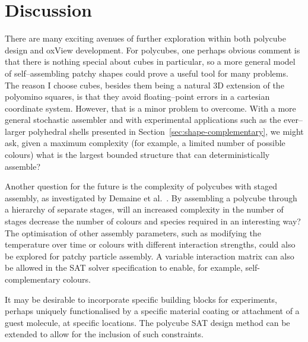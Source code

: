 \chapter{Discussion}
\label{ch:conclusion}

There are many exciting avenues of further exploration within both polycube design and oxView development. For polycubes, one perhaps obvious comment is that there is nothing special about cubes in particular, so a more general model of self--assembling patchy shapes could prove a useful tool for many problems. The reason I choose cubes, besides them being a natural 3D extension of the polyomino squares, is that they avoid floating--point errors in a cartesian coordinate system. However, that is a minor problem to overcome. With a more general stochastic assembler and with experimental applications such as the ever--larger polyhedral shells presented in Section~\ref{sec:shape-complementary}, we might ask, given a maximum complexity (for example, a limited number of possible colours) what is the largest bounded structure that can deterministically assemble?

Another question for the future is the complexity of polycubes with staged assembly, as investigated by Demaine et al.\ \cite{demaine2008staged}. By assembling a polycube through a hierarchy of separate stages, will an increased complexity in the number of stages decrease the number of colours and species required in an interesting way? The optimisation of other assembly parameters, such as modifying the temperature over time or colours with different interaction strengths, could also be explored for patchy particle assembly. A variable interaction matrix can also be allowed in the SAT solver specification to enable, for example, self-complementary colours.

It may be desirable to incorporate specific building blocks for experiments, perhaps uniquely functionalised by a specific material coating or attachment of a guest molecule, at specific locations. The polycube SAT design method can be extended to allow for the inclusion of such constraints.


